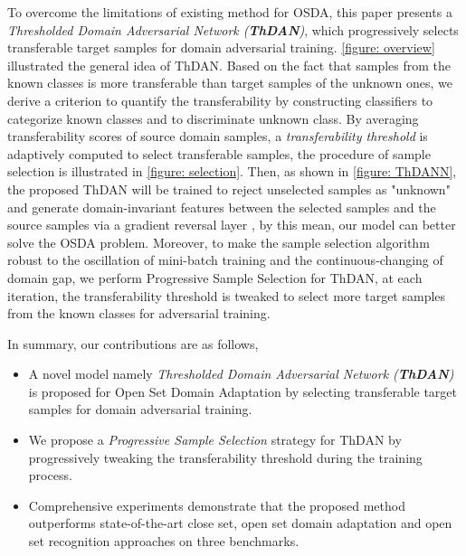 To overcome the limitations of existing method for OSDA, this paper presents a \textit{Thresholded Domain Adversarial Network (\textbf{ThDAN})}, which progressively selects transferable target samples for domain adversarial training. 
\figurename{\ref{figure: overview}} illustrated the general idea of ThDAN.
Based on the fact that samples from the known classes is more transferable than target samples of the unknown ones, we derive a criterion to quantify the transferability by constructing classifiers to categorize known classes and to discriminate unknown class.
By averaging transferability scores of source domain samples, a \textit{transferability threshold} is adaptively computed to select transferable samples, the procedure of sample selection is illustrated in \figurename{\ref{figure: selection}}.
Then, as shown in \figurename{\ref{figure: ThDANN}}, the proposed ThDAN will be trained to reject unselected samples as "unknown" and generate domain-invariant features between the selected samples and the source samples via a gradient reversal layer \cite{DomainAdversrialNetwork}, by this mean, our model can better solve the OSDA problem.
Moreover, to make the sample selection algorithm robust to the oscillation of mini-batch training and the continuous-changing of domain gap, we perform Progressive Sample Selection for ThDAN, at each iteration, the transferability threshold is tweaked to select more target samples from the known classes for adversarial training.

In summary, our contributions are as follows,

\begin{itemize}

    \item A novel model namely \textit{Thresholded Domain Adversarial Network (\textbf{ThDAN})} is proposed for Open Set Domain Adaptation by selecting transferable target samples for domain adversarial training.

    \item We propose a \textit{Progressive Sample Selection} strategy for ThDAN by progressively tweaking the transferability threshold during the training process.

    \item Comprehensive experiments demonstrate that the proposed method outperforms state-of-the-art close set, open set domain adaptation and open set recognition approaches on three benchmarks.

\end{itemize}



